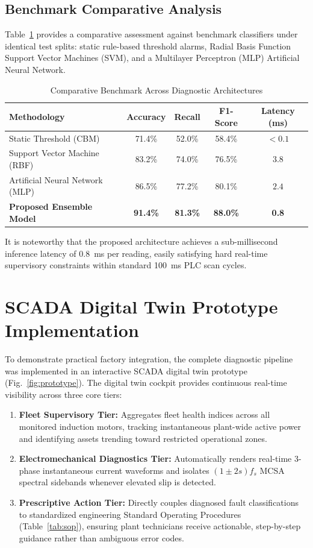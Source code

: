 \documentclass[conference]{IEEEtran}
\begin{document}
\subsection{Benchmark Comparative Analysis}
Table~\ref{tab:comparison} provides a comparative assessment against benchmark classifiers under identical test splits: static rule-based threshold alarms, Radial Basis Function Support Vector Machines (SVM), and a Multilayer Perceptron (MLP) Artificial Neural Network.

\begin{table}[htbp]
\caption{Comparative Benchmark Across Diagnostic Architectures}
\label{tab:comparison}
\centering
\begin{tabular}{lcccc}
\toprule
\textbf{Methodology} & \textbf{Accuracy} & \textbf{Recall} & \textbf{F1-Score} & \textbf{Latency (ms)} \\
\midrule
Static Threshold (CBM) & 71.4\% & 52.0\% & 58.4\% & $< 0.1$ \\
Support Vector Machine (RBF) & 83.2\% & 74.0\% & 76.5\% & $3.8$ \\
Artificial Neural Network (MLP) & 86.5\% & 77.2\% & 80.1\% & $2.4$ \\
\textbf{Proposed Ensemble Model} & \textbf{91.4\%} & \textbf{81.3\%} & \textbf{88.0\%} & \textbf{0.8} \\
\bottomrule
\end{tabular}
\end{table}

It is noteworthy that the proposed architecture achieves a sub-millisecond inference latency of 0.8~ms per reading, easily satisfying hard real-time supervisory constraints within standard 100~ms PLC scan cycles.

\section{SCADA Digital Twin Prototype Implementation}

To demonstrate practical factory integration, the complete diagnostic pipeline was implemented in an interactive SCADA digital twin prototype (Fig.~\ref{fig:prototype}). The digital twin cockpit provides continuous real-time visibility across three core tiers:
\begin{enumerate}
    \item \textbf{Fleet Supervisory Tier:} Aggregates fleet health indices across all monitored induction motors, tracking instantaneous plant-wide active power and identifying assets trending toward restricted operational zones.
    \item \textbf{Electromechanical Diagnostics Tier:} Automatically renders real-time 3-phase instantaneous current waveforms and isolates $(1 \pm 2s)f_s$ MCSA spectral sidebands whenever elevated slip is detected.
    \item \textbf{Prescriptive Action Tier:} Directly couples diagnosed fault classifications to standardized engineering Standard Operating Procedures (Table~\ref{tab:sop}), ensuring plant technicians receive actionable, step-by-step guidance rather than ambiguous error codes.
\end{enumerate}
\end{document}
